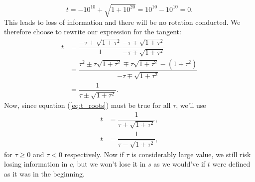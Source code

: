 \documentclass{emulateapj}
\begin{document}
        \begin{equation}
            t = -10^{10} + \sqrt{1 + 10^{20}} = 10^{10} - 10^{10} = 0. \nonumber
        \end{equation}
        This leads to loss of information and there will be no rotation conducted. We therefore choose to rewrite our expression for the tangent:%
        \begin{align}
            t &= \dfrac{-\tau \pm \sqrt{1 + \tau^2}}{1}\dfrac{-\tau \mp \sqrt{1 + \tau^2}}{-\tau \mp \sqrt{1 + \tau^2}} \nonumber
            \\
            &= \dfrac{\tau^2 \pm \tau \sqrt{1 + \tau^2} \mp \tau \sqrt{1 + \tau^2} - (1 + \tau^2)}{-\tau \mp \sqrt{1 + \tau^2}} \nonumber
            \\
            &= \dfrac{1}{\tau \pm \sqrt{1 + \tau^2}}.
        \end{align}
        Now, since equation (\ref{eq:t_roots}) must be true for all \(\tau\), we'll use
        \begin{align}
            t  &= \dfrac{1}{\tau + \sqrt{1 + \tau^2}}, \nonumber
            \\
            t &= \dfrac{1}{\tau - \sqrt{1 + \tau^2}}, \nonumber
        \end{align}
        for \(\tau \geq 0\) and \(\tau < 0\) respectively. %
        Now if \(\tau\) is considerably large value, we still risk losing information in \(c\), but we won't lose it in \(s\) as we would've if \(t\) were defined as it was in the beginning.
    
\end{document}
